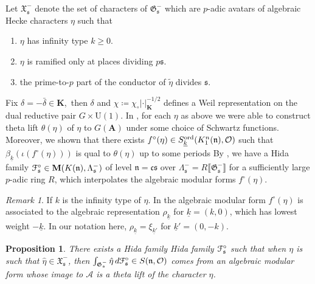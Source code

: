 \documentclass[leqno]{amsart}
\newcommand{\euF}{\EuScript{F}} %
\newcommand{\M}{\mathbf{M}} %
\newcommand{\wt}[1]{\underline{ #1 }}
\newcommand{\fG}{\mathfrak{G}}
\newcommand{\fX}{\mathfrak{X}}
\newcommand{\ord}{\textnormal{ord}}
\newcommand{\A}{\mathbf A}
\newcommand{\K}{{\mathbf{K}}} %
\newcommand{\oo}{\mathcal{O}} %
\newcommand{\fc}{\mathfrak{c}}
\newcommand{\fs}{\mathfrak{s}}
\newcommand{\fn}{\mathfrak{n}}
\newtheorem{prop}[thm]{Proposition}
\theoremstyle{definition}
\theoremstyle{remark}
\newtheorem{rem}[thm]{Remark}
\begin{document}
Let $\fX_{\fs}^-$ denote
the set of characters of $\fG_{\fs}^-$
which are $p$-adic avatars of 
algebraic Hecke characters $\eta$ such that 
\begin{enumerate}
    \item $\eta$ has infinity type $k\geq 0$.
    \item $\eta$ is ramified only at places dividing $p\fs$.
    \item the prime-to-$p$ part of the conductor of $\tilde{\eta}$ divides $\fs$.
\end{enumerate}
Fix $\delta=-\bar{\delta}\in \K$,\
then $\delta$ and $\chi\coloneqq \chi_\circ|\cdot|_\K^{-1/2}$
defines a Weil representation
on the dual reductive pair $G\times \mathrm{U}(1)$.
In \cite{lee},
for each $\eta$ as above
we were able to construct
theta lift $\theta(\eta)$ of  $\eta$ to  $G(\A)$ 
under some choice of Schwartz functions.
Moreover, we shown that 
there exists $f^\circ(\eta)\in 
S_{\wt{k}}^{\ord}(K^n_1(\fn),\oo)$
such that 
$\beta_{\wt{k}}(\iota(f^\circ(\eta)))$
is qual to $\theta(\eta)$ up to some periods
By \cite[Thm 7.6]{lee},
we have a Hida family
$\euF^\circ_{\fs}\in \M(K(\fn),\Lambda_{\fs}^-)$
of level $\fn=\fc\fs$ over $\Lambda_{\fs}^-=R\llbracket \fG_{\fs}^-\rrbracket$ for 
a sufficiently large $p$-adic ring $R$,
which interpolates the algebraic modular forms
$f^\circ(\eta)$.

\begin{rem}
	If $k$ is the infinity type of  $\eta$.
	In \cite{lee} 
	the algebraic modular form  $f^\circ(\eta)$
	is associated to the algebraic representation
	 $\rho_{\wt{k}}$ for $\wt{k}=(k,0)$,
	 which has lowest weight $-\wt{k}$.
	 In our notation here,
	 $\rho_{\wt{k}}=\xi_{\wt{k}'}$
	 for $\wt{k}'=(0,-k)$.
\end{rem}

\begin{prop}
There exists a Hida family
Hida family $\euF^\circ_{\fs}$ such that 
when $\eta$ is such that  $ \hat{\eta}\in \fX_\fs^{-}$,
then 
$\int_{\fG_{\fs}^{-}}\hat{\eta}\,d\euF^\circ_{\fs}
\in S(\fn, \oo)$
comes from an algebraic modular form
whose image to $\mathcal{A}$
is a theta lift of the character  $\eta$.
\end{prop}
\end{document}

